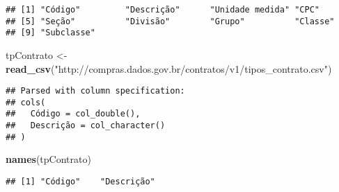 \documentclass[]{article}
\newenvironment{Shaded}{\begin{snugshade}}{\end{snugshade}}
\newcommand{\KeywordTok}[1]{\textcolor[rgb]{0.13,0.29,0.53}{\textbf{#1}}}
\newcommand{\StringTok}[1]{\textcolor[rgb]{0.31,0.60,0.02}{#1}}
\newcommand{\NormalTok}[1]{#1}
\begin{document}
\begin{verbatim}
## [1] "Código"         "Descrição"      "Unidade medida" "CPC"           
## [5] "Seção"          "Divisão"        "Grupo"          "Classe"        
## [9] "Subclasse"
\end{verbatim}

\begin{Shaded}
\begin{Highlighting}[]
\NormalTok{tpContrato <-}\StringTok{ }\KeywordTok{read_csv}\NormalTok{(}\StringTok{"http://compras.dados.gov.br/contratos/v1/tipos_contrato.csv"}\NormalTok{)}
\end{Highlighting}
\end{Shaded}

\begin{verbatim}
## Parsed with column specification:
## cols(
##   Código = col_double(),
##   Descrição = col_character()
## )
\end{verbatim}

\begin{Shaded}
\begin{Highlighting}[]
\KeywordTok{names}\NormalTok{(tpContrato)}
\end{Highlighting}
\end{Shaded}

\begin{verbatim}
## [1] "Código"    "Descrição"
\end{verbatim}
\end{document}
